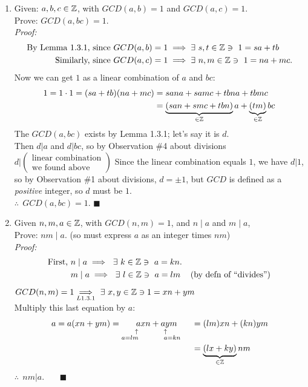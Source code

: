 \begin{enumerate}
    \item Given: $a, b, c \in {\mathbb{ Z}}$, with $GCD(a, b) = 1$ and $GCD(a, c) = 1$.\\
    Prove: $GCD(a, bc) = 1$.\\

          \textit{Proof:}  
          \begin{align*}
            \text{By Lemma 1.3.1, since } &GCD(a, b) = 1 \implies \exists \ s, t \in \Z \ni \ 1=sa+tb \\
          \text{Similarly, since } &GCD(a, c) = 1 \implies \exists \ n, m \in \Z \ni \ 1 = na + mc.
          \end{align*}
          Now we can get $1$ as a linear combination of $a$ and $bc$:
          \begin{align*}
            1 = 1\cdot 1 = (sa+tb)(na+mc) &= sana + samc +tbna +tbmc \\
            &= \underbrace{(san + smc + tbn)}_{\in {\mathbb{ Z}}}a + \underbrace{(tm)}_{\in {\mathbb{ Z}}}bc
          \end{align*}
          The $GCD(a,bc)$ exists by Lemma 1.3.1; let's say it is $d$. \\
          Then $d|a$ and $d|bc$, so by Observation \#4 about divisions $d|(\substack{\text{linear combination} \\ \text{we found above}})$
          Since the linear combination equals $1$, we have $d|1$, so by Observation \#1 about divisions, $d=\pm 1$, but $GCD$ is defined as a \textit{positive} integer, so $d$ must be $1$. \\
          $\therefore \ \ GCD(a,bc)=1$. $\blacksquare$
          \newpage 
    \item Given $n, m, a \in {\mathbb{ Z}}$, with $GCD(n, m) = 1$, and $n \mid a$ and $m \mid a$, \\
    Prove: $nm \mid a$. (so must express $a$ as an integer times $nm$) \\

          \noindent \textit{Proof:}  
          \begin{align*}
            \text{First, } &n \mid a \implies \ \exists \ k \in {\mathbb{ Z}} \ni \ a = kn.  & \\
            & m \mid a \implies \ \exists \ l \in {\mathbb{ Z}} \ni \ a = l m  & (\text{by defn of ``divides''})
          \end{align*}
          $GCD(n, m) = 1 \underset{L 1.3.1}{\implies} \ \exists \ x, y \in {\mathbb{ Z}} \ni 1 = xn+ym$ \\
          Multiply this last equation by $a$:
          \begin{align*}
            a = a(xn + ym) = \underset{\substack{\uparrow \ \ \ \ \ \ \ \ \ \uparrow \ \ \ \ \\ a=lm \ \ \ \ \ \ \ \ \ a=kn \ \ \ \ }}{axn+aym} &= (lm)xn + (kn)ym \\ 
            &= \underbrace{(lx+ky)}_{\in \Z}nm
          \end{align*}
          $\therefore \ \ nm | a$. \ \ \ $\blacksquare$
\end{enumerate}

